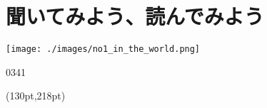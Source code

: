 \documentclass[aspectratio=169,xcolor={dvipsnames,table}]{beamer}
\begin{document}
\section{聞いてみよう、読んでみよう}
\begin{frame}[plain]
 
\texttt{[image: ./images/no1\_in\_the\_world.png]}

\vspace{-30pt}

\hfill{\tiny 0341}\,{\scriptsize {}}

\normalsize
\begin{textblock*}{0.4\linewidth}(130pt,218pt)
\end{textblock*}
\end{frame}
\end{document}
